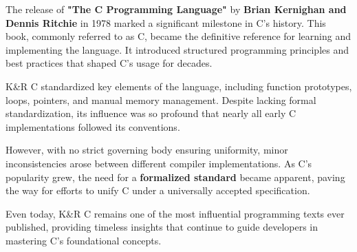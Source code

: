 \begin{NxSSSSBox}[breakable][K and R C]
	\begin{NxIDBox}
		The release of \textbf{"The C Programming Language"} by \textbf{Brian Kernighan and Dennis Ritchie} in 1978 marked a significant milestone in C’s history. This book, commonly referred to as  C, became the definitive reference for learning and implementing the language. It introduced structured programming principles and best practices that shaped C’s usage for decades.
	\end{NxIDBox}
	\begin{NxIDBox}
		K\&R C standardized key elements of the language, including function prototypes, loops, pointers, and manual memory management. Despite lacking formal standardization, its influence was so profound that nearly all early C implementations followed its conventions.
	\end{NxIDBox}
	\begin{NxIDBox}
		However, with no strict governing body ensuring uniformity, minor inconsistencies arose between different compiler implementations. As C’s popularity grew, the need for a \textbf{formalized standard} became apparent, paving the way for efforts to unify C under a universally accepted specification.
	\end{NxIDBox}
	\begin{NxIDBox}
		Even today, K\&R C remains one of the most influential programming texts ever published, providing timeless insights that continue to guide developers in mastering C’s foundational concepts.
	\end{NxIDBox}
\end{NxSSSSBox}

